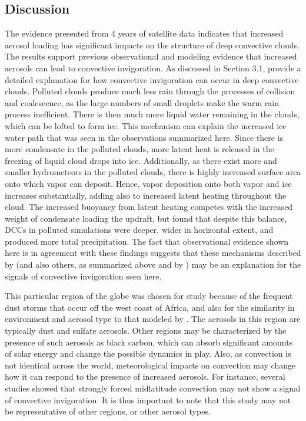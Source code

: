 \subsection{Discussion}
The evidence presented from 4 years of satellite data indicates that increased aerosol loading has significant impacts on the structure of deep convective clouds.  The results support previous observational and modeling evidence \citep{Andreae:2004p32,Khain:2005p71,vandenHeever:2006p1147,vandenHeever:2007p53,Lee:2008p3014,Rosenfeld:2008p24,Lebo:2011p8933, rcepaper} that increased aerosols can lead to convective invigoration.  As discussed in Section 3.1, \citet{rcepaper} provide a detailed explanation for how convective invigoration can occur in deep convective clouds.  Polluted clouds produce much less rain through the processes of collision and coalescence, as the large numbers of small droplets make the warm rain process inefficient.  There is then much more liquid water remaining in the clouds, which can be lofted to form ice.  This mechanism can explain the increased ice water path that was seen in the observations summarized here.  Since there is more condensate in the polluted clouds, more latent heat is released in the freezing of liquid cloud drops into ice.  Additionally, as there exist more and smaller hydrometeors in the polluted clouds, there is highly increased surface area onto which vapor can deposit.  Hence, vapor deposition onto both vapor and ice increases substantially, adding also to increased latent heating throughout the cloud.  The increased buoyancy from latent heating competes with the increased weight of condensate loading the updraft, but \citet{rcepaper} found that despite this balance, DCCs in polluted simulations were deeper, wider in horizontal extent, and produced more total precipitation.  The fact that observational evidence shown here is in agreement with these findings suggests that these mechanisms described by \citet{rcepaper} (and also others, as summarized above and by \citet{taoreview}) may be an explanation for the signals of convective invigoration seen here.

This particular region of the globe was chosen for study because of the frequent dust storms that occur off the west coast of Africa, and also for the similarity in environment and aerosol type to that modeled by \citet{rcepaper}.  The aerosols in this region are typically dust and sulfate aerosols.  Other regions may be characterized by the presence of such aerosols as black carbon, which can absorb significant amounts of solar energy and change the possible dynamics in play.  Also, as convection is not identical across the world, meteorological impacts on convection may change how it can respond to the presence of increased aerosols.  For instance, several studies \citep[e.g.][]{Khain:2010p8508, Storer:2010p8001} showed that strongly forced midlatitude convection may not show a signal of convective invigoration.  It is thus important to note that this study may not be representative of other regions, or other aerosol types.  

